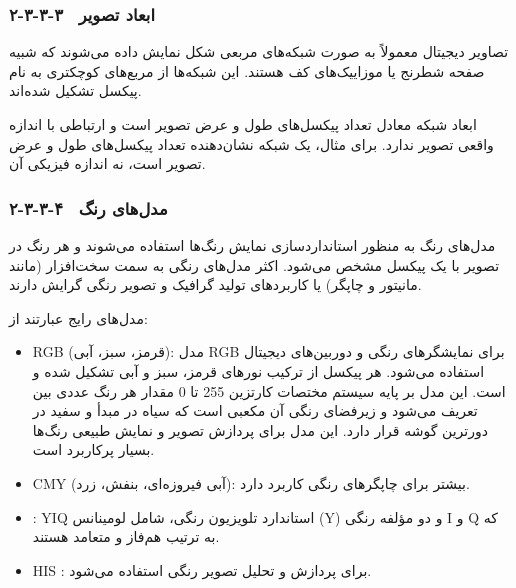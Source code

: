 \subsubsection{۲-۳-۳-۳  ابعاد تصویر}

تصاویر دیجیتال معمولاً به صورت شبکه‌های مربعی شکل نمایش داده می‌شوند که شبیه صفحه شطرنج یا موزاییک‌های کف هستند. این شبکه‌ها از مربع‌های کوچکتری به نام پیکسل تشکیل شده‌اند.

ابعاد شبکه معادل تعداد پیکسل‌های طول و عرض تصویر است و ارتباطی با اندازه واقعی تصویر ندارد. برای مثال، یک شبکه  نشان‌دهنده تعداد پیکسل‌های طول و عرض تصویر است، نه اندازه فیزیکی آن\cite{ref42}.

\subsubsection{۲-۳-۳-۴  مدل‌های رنگ}

مدل‌های رنگ به منظور استانداردسازی نمایش رنگ‌ها استفاده می‌شوند و هر رنگ در تصویر با یک پیکسل مشخص می‌شود. اکثر مدل‌های رنگی به سمت سخت‌افزار (مانند مانیتور و چاپگر) یا کاربردهای تولید گرافیک و تصویر رنگی گرایش دارند\cite{ref43}.

مدل‌های رایج عبارتند از:

\begin{itemize}
    \item ‎RGB‎  (قرمز، سبز، آبی): مدل ‎RGB‎ برای نمایشگرهای رنگی و دوربین‌های دیجیتال استفاده می‌شود. هر پیکسل از ترکیب نورهای قرمز، سبز و آبی تشکیل شده و مقدار هر رنگ عددی بین ‎0‎ تا ‎255‎ است. این مدل بر پایه سیستم مختصات کارتزین تعریف می‌شود و زیرفضای رنگی آن مکعبی است که سیاه در مبدأ و سفید در دورترین گوشه قرار دارد. این مدل برای پردازش تصویر و نمایش طبیعی رنگ‌ها بسیار پرکاربرد است.
\end{itemize}

\begin{itemize}
    \item ‎CMY‎  (آبی فیروزه‌ای، بنفش، زرد): بیشتر برای چاپگرهای رنگی کاربرد دارد.
\end{itemize}

\begin{itemize}
    \item : ‎YIQ‎  استاندارد تلویزیون رنگی، شامل لومینانس (‎Y‎) و دو مؤلفه رنگی ‎I‎ و ‎Q‎ که به ترتیب هم‌فاز و متعامد هستند.
\end{itemize}

\begin{itemize}
    \item ‎HIS‎  : برای پردازش و تحلیل تصویر رنگی استفاده می‌شود.
\end{itemize}

